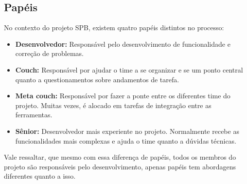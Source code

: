 \documentclass[a4paper, 11pt]{article}
\begin{document}
\begin{table}[h]
    \caption{Atividades relacionadas a etapa de Desenvolver funcionalidades}
    \label{tab:atividades_desenvolver}
\end{table}

\subsection*{Papéis}

No contexto do projeto SPB, existem quatro papéis distintos no processo:

\begin{itemize}
    \item \textbf{Desenvolvedor:} Responsável pelo desenvolvimento de
        funcionalidade e correção de problemas.
    \item \textbf{Couch:} Responsável por ajudar o time a se organizar e se um
        ponto central quanto a questionamentos sobre andamentos de tarefa.
    \item \textbf{Meta couch:} Responsável por fazer a ponte entre os diferentes
        time do projeto. Muitas vezes, é alocado em tarefas de integração entre
        as ferramentas.
    \item \textbf{Sênior:} Desenvolvedor mais experiente no projeto. Normalmente
        recebe as funcionalidades mais complexas e ajuda o time quanto a dúvidas
        técnicas.
\end{itemize}

Vale ressaltar, que mesmo com essa diferença de papéis, todos os membros do
projeto são responsáveis pelo desenvolvimento, apenas papéis tem abordagens
diferentes quanto a isso.
\end{document}
